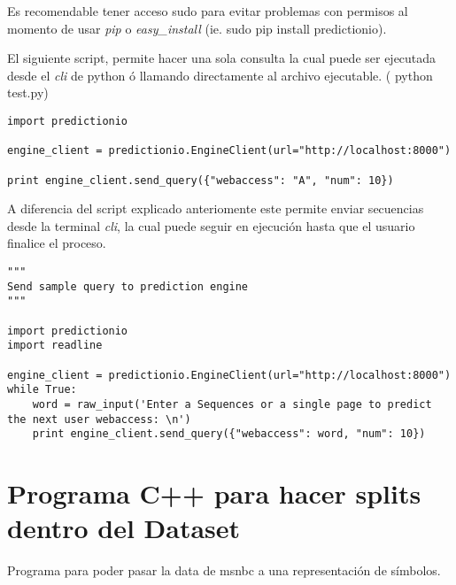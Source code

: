 Es recomendable tener acceso sudo para evitar problemas con permisos al momento de usar \emph{pip} o \emph{easy\_install} {(ie. sudo pip install predictionio)}.




El siguiente script, permite hacer una sola consulta la cual puede ser ejecutada desde el \emph{cli} de python ó llamando directamente al archivo ejecutable. ( {python test.py})

\begin{lstlisting}[frame=single,basicstyle=\ttfamily\tiny,]
import predictionio

engine_client = predictionio.EngineClient(url="http://localhost:8000")

print engine_client.send_query({"webaccess": "A", "num": 10})
\end{lstlisting}



\newpage
A diferencia del script explicado anteriomente este permite enviar secuencias desde la terminal \emph{cli}, la cual puede seguir en ejecución hasta que el usuario finalice el proceso.

\begin{lstlisting}[frame=single,basicstyle=\ttfamily\tiny,]
"""
Send sample query to prediction engine
"""

import predictionio
import readline

engine_client = predictionio.EngineClient(url="http://localhost:8000")
while True:
    word = raw_input('Enter a Sequences or a single page to predict the next user webaccess: \n')
    print engine_client.send_query({"webaccess": word, "num": 10})

\end{lstlisting}





\section{Programa C++ para hacer splits dentro del Dataset}
Programa para poder pasar la data de msnbc a una representación de símbolos.


